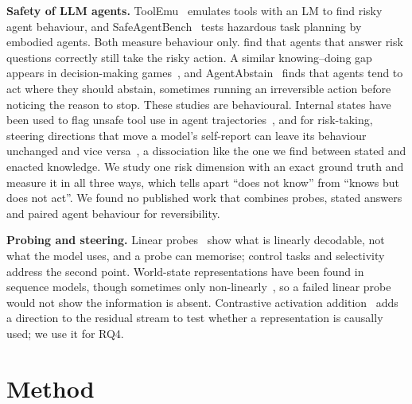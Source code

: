 \documentclass[conference]{IEEEtran}
\begin{document}
\textbf{Safety of LLM agents.} ToolEmu~\cite{ruan2024toolemu} emulates tools with an LM to find risky agent behaviour, and SafeAgentBench~\cite{yin2024safeagentbench} tests hazardous task planning by embodied agents. Both measure behaviour only. \cite{tang2025risk} find that agents that answer risk questions correctly still take the risky action. A similar knowing--doing gap appears in decision-making games~\cite{schmied2025greedy}, and AgentAbstain~\cite{liu2026agentabstain} finds that agents tend to act where they should abstain, sometimes running an irreversible action before noticing the reason to stop. These studies are behavioural. Internal states have been used to flag unsafe tool use in agent trajectories~\cite{jiao2026agentsafety}, and for risk-taking, steering directions that move a model's self-report can leave its behaviour unchanged and vice versa~\cite{kocielnik2026selfreport}, a dissociation like the one we find between stated and enacted knowledge. We study one risk dimension with an exact ground truth and measure it in all three ways, which tells apart ``does not know'' from ``knows but does not act''. We found no published work that combines probes, stated answers and paired agent behaviour for reversibility.

\textbf{Probing and steering.} Linear probes~\cite{alain2016probes} show what is linearly decodable, not what the model uses, and a probe can memorise; control tasks and selectivity~\cite{hewitt2019control} address the second point. World-state representations have been found in sequence models, though sometimes only non-linearly~\cite{li2023othello}, so a failed linear probe would not show the information is absent. Contrastive activation addition~\cite{rimsky2024caa} adds a direction to the residual stream to test whether a representation is causally used; we use it for RQ4.

\section{Method}
\end{document}
